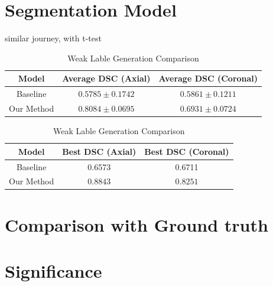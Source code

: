 \section{Segmentation Model}
similar journey, with t-test
\begin{table}[ht]
    \begin{subtable}[b]{\textwidth}
        \centering
        \begin{tabular}{c | c | c}
        Model & Average DSC (Axial) & Average DSC (Coronal) \\
        \hline
        Baseline & \(0.5785 \pm 0.1742\)  & \(0.5861 \pm 0.1211\)\\
        \hline
        Our Method & \(\mathbf{0.8084 \pm 0.0695}\) & \(\mathbf{0.6931 \pm 0.0724}\) 
       \end{tabular}
       \caption{Average Case Comparison}
       \label{tab:average-sseg}
    \end{subtable}
    \vfill
    \begin{subtable}[b]{\textwidth}
        \centering
        \begin{tabular}{c | c | c}
        Model & Best DSC (Axial) & Best DSC (Coronal) \\
        \hline
        Baseline & 0.6573 & 0.6711\\
        \hline
        Our Method & \(\mathbf{0.8843}\) & \(\mathbf{0.8251}\)
       \end{tabular}
       \caption{Best Case Comparison}
       \label{tab:best-seg}
    \end{subtable}
     \caption{Weak Lable Generation Comparison}
     \label{tab:seg}
\end{table}
\section{Comparison with Ground truth}

\section{Significance}







